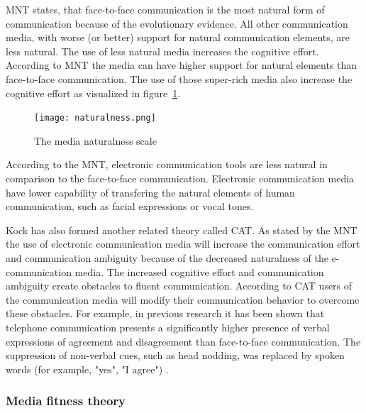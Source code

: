 \documentclass[english,12pt,a4paper,pdftex]{article}
\begin{document}

\Ac{MNT} states, that face-to-face communication is the most natural form of communication because of the evolutionary evidence. All other communication media, with worse (or better) support for natural communication elements, are less natural. The use of less natural media increases the cognitive effort. According to \ac{MNT} the media can have higher support for natural elements than face-to-face communication. The use of those super-rich media also increase the cognitive effort as visualized in figure~\ref{fig:media_naturalness_scale}. \citep{kock2005} \citep{kock2004}

\begin{figure}[htb]
\begin{center}
\texttt{[image: naturalness.png]}
\end{center}
\caption{The media naturalness scale \citep{kock2004}}
\label{fig:media_naturalness_scale}
\end{figure}

According to the \ac{MNT}, electronic communication tools are less natural in comparison to the face-to-face communication. Electronic communication media have lower capability of transfering the natural elements of human communication, such as facial expressions or vocal tones.

Kock has also formed another related theory called \ac{CAT}. As stated by the \ac{MNT} the use of electronic communication media will increase the communication effort and communication ambiguity because of the decreased naturalness of the e-communication media. The increased cognitive effort and communication ambiguity create obstacles to fluent communication. According to \ac{CAT} users of the communication media will modify their communication behavior to overcome these obstacles. For example, in previous research it has been shown that telephone communication presents a significantly higher presence of verbal expressions of agreement and disagreement than face-to-face communication. The suppression of non-verbal cues, such as head nodding, was replaced by spoken words (for example, "yes", "I agree") \citep{kock2007}.

\subsubsection{Media fitness theory}
\end{document}
